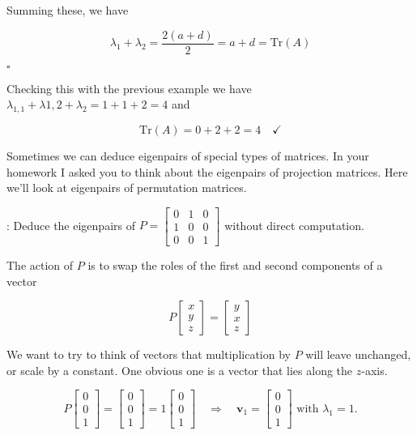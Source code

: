 \documentclass[12pt]{article}
\newcommand{\nin}{\noindent}
\newcommand{\vthree}{\vspace{3mm}}
\newcommand{\myp}[1]{\left( #1 \right)}
\newcommand{\mymat}[1]{
\left[
\begin{array}{rrrrrrrrrrrrrrrrrrrrrrrrrrrrrrrrrrrrrrr}
#1
\end{array}
\right]
}
\newcommand{\bv}{\mathbf{v}}
\begin{document}
\vthree

\nin Summing these, we have

\[
\lambda_1 + \lambda_2 = \frac{2\myp{a+d}}{2} = a+d = \textrm{Tr}\myp{A}
\]

\hfill $\square$

\vthree

\nin Checking this with the previous example we have $\lambda_{1,1} + \lambda{1,2} + \lambda_2 = 1 + 1 + 2 = 4$ and

\[
\textrm{Tr}\myp{A} = 0 + 2 + 2 = 4 \quad \checkmark
\]

\vthree

\nin Sometimes we can deduce eigenpairs of special types of matrices.  In your homework I asked you to think about the eigenpairs of projection matrices. Here we'll look at eigenpairs of permutation matrices.

\clearpage

\nin {\bf Example 2}: Deduce the eigenpairs of $P = \mymat{0 & 1 & 0 \\ 1 & 0 & 0 \\ 0 & 0 & 1}$ without direct computation.

\vthree

\nin The action of $P$ is to swap the roles of the first and second components of a vector

\[
P\mymat{x \\ y \\ z} = \mymat{y \\ x \\ z}
\]

\vthree

\nin We want to try to think of vectors that multiplication by $P$ will leave unchanged, or scale by a constant.  One obvious one is a vector that lies along the $z$-axis.

\vthree

\[
P\mymat{0 \\ 0 \\ 1} = \mymat{0 \\ 0 \\ 1} = 1 \mymat{0 \\ 0 \\ 1} \quad \Rightarrow \quad \bv_1 = \mymat{0 \\ 0 \\ 1} \textrm{ with } \lambda_1 = 1.
\]


\end{document}
